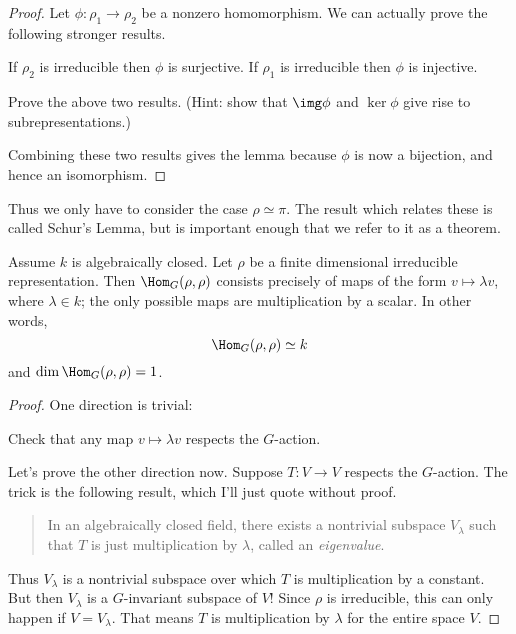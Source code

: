 \begin{proof}
	Let $\phi : \rho_1 \to \rho_2$ be a nonzero homomorphism.
	We can actually prove the following stronger results.
	\begin{itemize}
		\ii If $\rho_2$ is irreducible then $\phi$ is surjective.
		\ii If $\rho_1$ is irreducible then $\phi$ is injective.
	\end{itemize}
	\begin{ques}
		Prove the above two results.
		(Hint: show that $\img \phi$ and $\ker \phi$ give rise to subrepresentations.)
	\end{ques}
	Combining these two results gives the lemma because $\phi$ is now a bijection,
	and hence an isomorphism.
\end{proof}

Thus we only have to consider the case $\rho \simeq \pi$.
The result which relates these is called Schur's Lemma, but is important enough that we refer to it as a theorem.
\begin{theorem}
	Assume $k$ is algebraically closed.
	Let $\rho$ be a finite dimensional irreducible representation.
	Then $\Hom_{G} (\rho, \rho)$ consists precisely of maps of the form $v \mapsto \lambda v$, where $\lambda \in k$; the only possible maps are multiplication by a scalar.
	In other words, \[ \Hom_{G} (\rho, \rho) \simeq k \]
	and $\dim \Hom_G(\rho, \rho) = 1$.
\end{theorem}

\begin{proof}[Proof]
	One direction is trivial:
	\begin{ques}
		Check that any map $v \mapsto \lambda v$ respects the $G$-action.
	\end{ques}

	Let's prove the other direction now.
	Suppose $T : V \to V$ respects the $G$-action.
	The trick is the following result, which I'll just quote without proof.

	\begin{quote}
		In an algebraically closed field, there exists a nontrivial subspace $V_\lambda$ such that $T$ is just multiplication by $\lambda$,
		called an \emph{eigenvalue}.
	\end{quote}
	Thus $V_\lambda$ is a nontrivial subspace over which $T$
	is multiplication by a constant.
	But then $V_\lambda$ is a $G$-invariant subspace of $V$! Since $\rho$ is irreducible, this can only happen if $V = V_\lambda$.
	That means $T$ is multiplication by $\lambda$ for the entire space $V$.
\end{proof}

